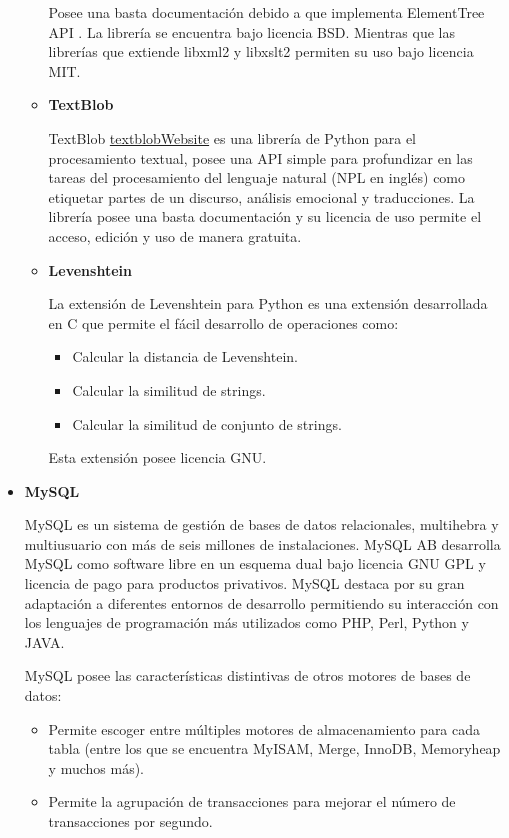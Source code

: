 \begin{itemize}
\begin{itemize}
			Posee una basta documentación debido a que implementa ElementTree API \cite{elementTree}. La librería se encuentra bajo licencia BSD. Mientras que las librerías que extiende libxml2 y libxslt2 permiten su uso bajo licencia MIT.
			
			\item \textbf{TextBlob}
			
			TextBlob \url{textblobWebsite} es una librería de Python para el procesamiento textual, posee una API simple para profundizar en las tareas  del procesamiento del lenguaje natural (NPL en inglés) como etiquetar partes de un discurso, análisis emocional y traducciones. La librería posee una basta documentación y su licencia de uso permite el acceso, edición y uso de manera gratuita.
			
			\item \textbf{Levenshtein}
			
			La extensión de Levenshtein \cite{pythonLeven} para Python es una extensión desarrollada en C que permite el fácil desarrollo de operaciones como: 
			\begin{itemize}
				\item Calcular la distancia de Levenshtein.
				\item Calcular la similitud de strings.
				\item Calcular la similitud de conjunto de strings.
			\end{itemize}
			
			Esta extensión posee licencia GNU.
		\end{itemize}

		
		\item \textbf{MySQL}
		
		MySQL \cite{mysqlWeb} es un sistema de gestión de bases de datos relacionales, multihebra y multiusuario con más de seis millones de instalaciones. MySQL AB desarrolla MySQL como software libre en un esquema dual bajo licencia GNU GPL y licencia de pago para productos privativos. MySQL destaca por su gran adaptación a diferentes entornos de desarrollo permitiendo su interacción con los lenguajes de programación más utilizados como PHP, Perl, Python y JAVA. 
		
		MySQL posee las características distintivas de otros motores de bases de datos:
		\begin{itemize}
			\item Permite escoger entre múltiples motores de almacenamiento para cada tabla (entre los que se encuentra MyISAM, Merge, InnoDB, Memoryheap y muchos más).
			\item Permite la agrupación de  transacciones para mejorar el número de transacciones por segundo.
		\end{itemize}
		

\end{itemize}
